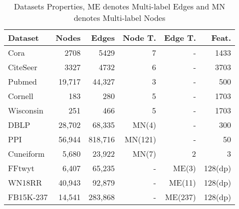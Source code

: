 \documentclass[10pt,journal,compsoc]{IEEEtran}
\begin{document}
\begin{table}[htbp]
 \centering
  \caption{Datasets Properties, ME denotes Multi-label Edges and MN denotes Multi-label Nodes}
\begin{tabular}{lrrrrr}
    \toprule
    \textbf{Dataset}  & \textbf{Nodes} &  \textbf{Edges} & \textbf{Node T.} & \textbf{Edge T.} & \textbf{Feat.} \\
    \midrule
    Cora &2708 & 5429& 7& -&1433 \\
    CiteSeer &3327 & 4732& 6& -&3703\\
    Pubmed  & 19,717  & 44,327  &  3  & - & 500\\
    Cornell &183 &280 & 5& -& 1703\\
    Wisconsin & 251&466 & 5& -& 1703\\
    DBLP  &  28,702 & 68,335 & MN(4) & - & 300\\
    PPI  &  56,944   &  818,716  &  MN(121)  &  - & 50 \\
    Cuneiform  & 5,680  & 23,922  &  MN(7)  & 2 &  3 \\
    FFtwyt  & 6,407  & 65,235   &  - & ME(3) &  128(dp) \\ 
    WN18RR  & 40,943  & 92,879  & -  & ME(11)  & 128(dp) \\
    FB15K-237  & 14,541  & 283,868  & -  & ME(237) & 128(dp) \\
    \bottomrule
    \end{tabular}
  \label{tab:datasets}
\end{table}

  
  














\end{document}

